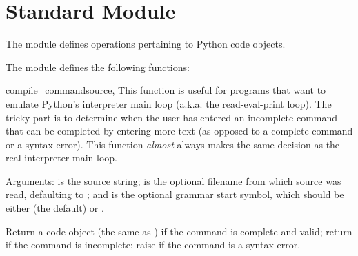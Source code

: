 \section{Standard Module }



The  module defines operations pertaining to Python code
objects.

The  module defines the following functions:


\begin{funcdesc}{compile_command}{source, }
This function is useful for programs that want to emulate Python's
interpreter main loop (a.k.a. the read-eval-print loop).  The tricky
part is to determine when the user has entered an incomplete command
that can be completed by entering more text (as opposed to a complete
command or a syntax error).  This function \emph{almost} always makes
the same decision as the real interpreter main loop.

Arguments:  is the source string;  is the
optional filename from which source was read, defaulting to
; and  is the optional grammar start
symbol, which should be either  (the default) or
.

Return a code object (the same as ) if the command is complete and valid;
return  if the command is incomplete; raise
 if the command is a syntax error.


\end{funcdesc}
